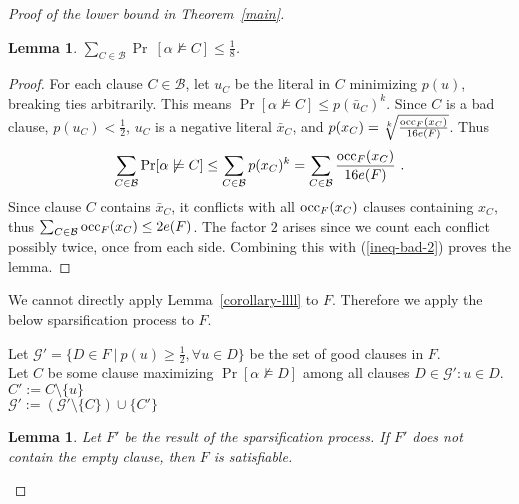\documentclass[a4paper, 11pt]{article}
\newtheorem{lemma}[theorem]{Lemma}
\newcommand{\occ}{\ensuremath{{\rm{occ}}}}
\begin{document}
\begin{proof}[Proof of the lower bound in Theorem~\ref{main}]
  \begin{lemma}
   $\sum_{C \in \mathcal{B}} \Pr\ [\alpha \not \models C] \leq \frac{1}{8}$.
   \label{prop-bad}
  \end{lemma}
  \begin{proof}
    For each clause $C \in \mathcal{B}$, let $u_C$ be the literal in
    $C$ minimizing $p(u)$, breaking ties arbitrarily. This means
    $\Pr[\alpha \not \models C] \leq p(\bar{u}_C)^k$. Since $C$ is a
    bad clause, $p(u_C) < \frac{1}{2}$, $u_C$ is a negative literal
    $\bar{x}_C$, and $p(x_C) = \sqrt[k]{\frac{\occ_F(x_C)}{16e(F)}}$.
    Thus
    \begin{eqnarray}
      \sum_{C \in \mathcal{B}} \Pr[\alpha
      \not \models C] \leq \sum_{C \in \mathcal{B}}
      p(x_C)^k = \sum_{C \in \mathcal{B}} \frac{\occ_F(x_C)}{16e(F)} \ .
      \label{ineq-bad-2}
    \end{eqnarray}
    Since clause $C$ contains $\bar{x}_C$, it conflicts with all
    $\occ_F(x_C)$ clauses containing $x_C$, thus $\sum_{C \in
      \mathcal{B}} \occ_F(x_C) \leq 2e(F)$.  The factor $2$ arises
    since we count each conflict possibly twice, once from each side.
    Combining this with (\ref{ineq-bad-2}) proves the lemma.
  \end{proof}


  We cannot directly apply Lemma~\ref{corollary-llll} to $F$.
  Therefore we apply the below sparsification process to $F$.
\begin{algorithm}[h]
\SetTitleSty{}{}
Let $\mathcal{G'}=\{D \in F \ | \  p(u) \geq \frac 12, \forall u \in D\}$
be the set of good clauses in $F$.\\
\vspace{1mm}
 {
   \vspace{1mm}
   Let $C$ be some clause maximizing 
   $\Pr[\alpha \not \models D]$
   among all clauses $D \in \mathcal{G}': u \in D$.\\
   \vspace{1mm}
   $C' := C \setminus \{u\}$\\
   $\mathcal{G}' := (\mathcal{G}' \setminus \{C\}) \cup \{C'\}$
   \vspace{1mm}
 }
\end{algorithm}


\begin{lemma}
  Let $F'$ be the result of the sparsification process. If $F'$ does
  not contain the empty clause, then $F$ is satisfiable.
  \label{prop-F'}
\end{lemma}


\end{proof}
\end{document}

